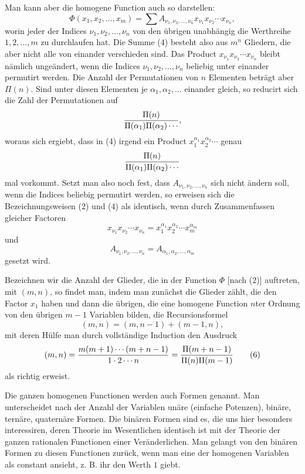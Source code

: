 \documentclass[11pt]{article}
\begin{document}
Man kann aber die homogene Function auch so darstellen:
\begin{equation}
 \Phi(x_1,x_2,\ldots,x_m)=
 \sum A_{\nu_1,\nu_2,\ldots,\nu_n}x_{\nu_1}x_{\nu_2}\cdots x_{\nu_n},
\tag{4}
\end{equation}
worin jeder der Indices $\nu_1,\nu_2,\ldots,\nu_n$ von den übrigen unabhängig die Werthreihe $1,2,\ldots,m$ zu durchlaufen hat. Die Summe (4) besteht also aus $m^n$ Gliedern, die aber nicht alle von einander verschieden sind. Das Product $x_{\nu_1}x_{\nu_2}\cdots x_{\nu_n}$ bleibt nämlich ungeändert, wenn die Indices $\nu_1,\nu_2,\ldots,\nu_n$ beliebig unter einander permutirt werden. Die Anzahl der Permutationen von $n$ Elementen beträgt aber $\Pi(n)$. Sind unter diesen Elementen je $\alpha_1,\alpha_2,\ldots$ einander gleich, so reducirt sich die Zahl der Permutationen auf
\[
 {\Pi(n)\over \Pi(\alpha_1)\Pi(\alpha_2)\cdots},
\]
woraus sich ergiebt, dass in (4) irgend ein Product $x_1^{\alpha_1}x_2^{\alpha_2}\cdots$ genau
\[
 {\Pi(n)\over \Pi(\alpha_1)\Pi(\alpha_2)\cdots}
\]
mal vorkommt. Setzt man also noch fest, dass $A_{\nu_1,\nu_2,\ldots,\nu_n}$ sich nicht ändern soll, wenn die Indices beliebig permutirt werden, so erweisen sich die Bezeichnungsweisen (2) und (4) als identisch, wenn durch Zusammenfassen gleicher Factoren
\[
 x_{\nu_1}x_{\nu_2}\cdots x_{\nu_n}=x_1^{\alpha_1}x_2^{\alpha_2}\cdots x_m^{\alpha_m}
\]
und
\[
 A_{\nu_1,\nu_2,\ldots,\nu_n}=A_{\alpha_1,\alpha_2,\ldots,\alpha_m}
\]
gesetzt wird.

Bezeichnen wir die Anzahl der Glieder, die in der Function $\Phi$ [nach (2)] auftreten, mit $(m,n)$, so findet man, indem man zunächst die Glieder zählt, die den Factor $x_1$ haben und dann die übrigen, die eine homogene Function $n$ter Ordnung von den übrigen $m-1$ Variablen bilden, die Recursionsformel
\begin{equation}
 (m,n)=(m,n-1)+(m-1,n),
\tag{5}
\end{equation}
mit deren Hülfe man durch vollständige Induction den Ausdruck
\begin{equation}
 (m,n)={m(m+1)\cdots(m+n-1)\over 1\cdot2\cdots n}
 ={ \Pi(m+n-1)\over \Pi(n)\Pi(m-1)}
\tag{6}
\end{equation}
als richtig erweist.

Die ganzen homogenen Functionen werden auch Formen genannt. Man unterscheidet nach der Anzahl der Variablen unäre (einfache Potenzen), binäre, ternäre, quaternäre Formen. Die binären Formen sind es, die uns hier besonders interessiren, deren Theorie im Wesentlichen identisch ist mit der Theorie der ganzen rationalen Functionen einer Veränderlichen. Man gelangt von den binären Formen zu diesen Functionen zurück, wenn man eine der homogenen Variablen als constant ansieht, z. B. ihr den Werth $1$ giebt.
\end{document}
